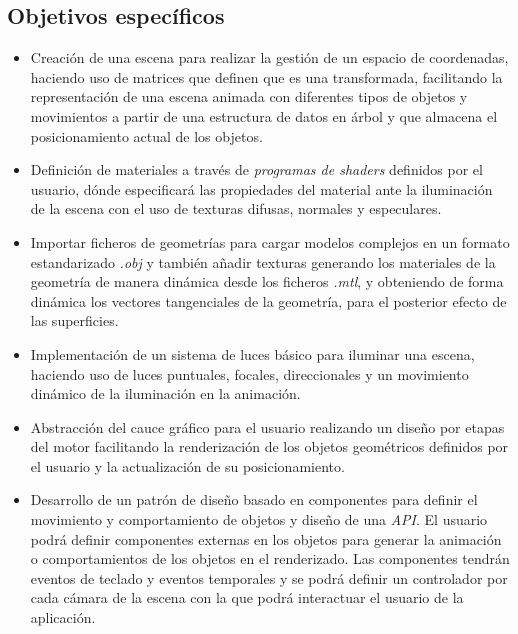 \documentclass[a4paper]{book}
\begin{document}
\subsection{Objetivos específicos}
\label{sec:objetivos-especificos}

\begin{itemize}
  \item Creación de una escena para realizar la gestión de un espacio de coordenadas, haciendo uso de
  matrices que definen que es una transformada, facilitando la representación de una escena animada con diferentes
  tipos de objetos y movimientos a partir de una estructura de datos en árbol y que almacena el posicionamiento 
  actual de los objetos.

  \item Definición de materiales a través de \textit{programas de shaders} definidos por el usuario, dónde especificará
  las propiedades del material ante la iluminación de la escena con el uso de texturas difusas, normales y especulares.

  \item Importar ficheros de geometrías para cargar modelos complejos en un formato estandarizado \textit{.obj}
  y también añadir texturas generando los materiales de la geometría de manera dinámica desde los ficheros \textit{.mtl},
  y obteniendo de forma dinámica los vectores tangenciales de la geometría, para el posterior efecto de las superficies.

  \item Implementación de un sistema de luces básico para iluminar una escena, haciendo uso de luces
  puntuales, focales, direccionales y un movimiento dinámico de la iluminación en la animación.

  \item Abstracción del cauce gráfico para el usuario realizando un diseño por etapas del motor
  facilitando la renderización de los objetos geométricos definidos por el usuario y la actualización 
  de su posicionamiento.

  \item Desarrollo de un patrón de diseño basado en componentes para definir el movimiento y
  comportamiento de objetos y diseño de una \textit{API}. El usuario podrá definir componentes
  externas en los objetos para generar la animación o comportamientos de los objetos en el renderizado.
  Las componentes tendrán eventos de teclado y eventos temporales y se podrá definir un controlador 
  por cada cámara de la escena con la que podrá interactuar el usuario de la aplicación.

\end{itemize}
\end{document}
